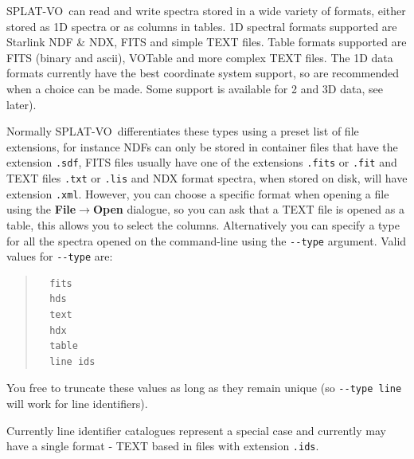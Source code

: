 \documentclass[twoside,11pt]{article}
\newcommand{\latexhtml}[2]{#1}
\renewcommand{\_}{\texttt{\symbol{95}}}
\newcommand{\SPLAT}{\textsf{SPLAT-VO}}
\newcommand{\submenuitem}[2]{\latexhtml{\textbf{#1$\rightarrow$#2}}{\textbf{#1->#2}}}
\newcommand{\hitext}[1]{\texttt{#1}}
\begin{document}
\SPLAT\ can read and write spectra stored in a wide variety of formats, either
stored as 1D spectra or as columns in tables. 1D spectral formats supported
are Starlink NDF \& NDX, FITS and simple TEXT files. Table formats supported
are FITS (binary and ascii), VOTable and more complex TEXT files. The 1D data
formats currently have the best coordinate system support, so are recommended
when a choice can be made. Some support is available for 2 and 3D data, see
later).

Normally \SPLAT\ differentiates these types using a preset list of file
extensions, for instance NDFs can only be stored in container files that have
the extension \hitext{.sdf}, FITS files usually have one of the extensions
\hitext{.fits} or \hitext{.fit} and TEXT files \hitext{.txt} or \hitext{.lis}
and NDX format spectra, when stored on disk, will have extension
\hitext{.xml}. However, you can choose a specific format when opening a file
using the \submenuitem{File}{Open} dialogue, so you can ask that a TEXT file
is opened as a table, this allows you to select the columns. Alternatively you
can specify a type for all the spectra opened on the command-line using the
\verb|--type| argument. Valid values for \verb|--type| are:
\begin{quote}
\begin{verbatim}
  fits
  hds
  text
  hdx
  table
  line ids
\end{verbatim}
\end{quote}
You free to truncate these values as long as they remain unique (so
\verb|--type line| will work for line identifiers).

Currently line identifier catalogues represent a special case and currently
may have a single format - TEXT based in files with extension \hitext{.ids}.
\end{document}
